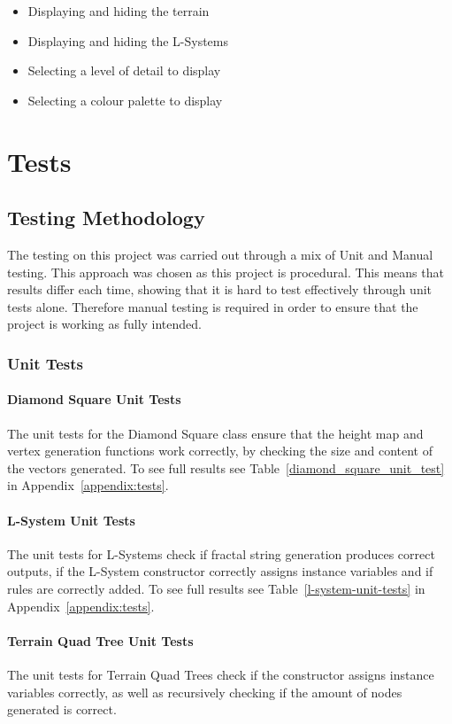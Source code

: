 \documentclass[a4paper,10pt]{report}
\begin{document}
\begin{itemize}
    \item Displaying and hiding the terrain
    \item Displaying and hiding the L-Systems
    \item Selecting a level of detail to display
    \item Selecting a colour palette to display
\end{itemize}

\chapter{Tests}
\section{Testing Methodology}
The testing on this project was carried out through a mix of Unit and Manual testing. This approach was chosen as this project is procedural. This means that results differ each time, showing that it is hard to test effectively through unit tests alone. Therefore manual testing is required in order to ensure that the project is working as fully intended.

\subsection{Unit Tests}
\subsubsection{Diamond Square Unit Tests}

The unit tests for the Diamond Square class ensure that the height map and vertex generation functions work correctly, by checking the size and content of the vectors generated. To see full results see Table~\ref{diamond_square_unit_test} in Appendix~\ref{appendix:tests}.

\subsubsection{L-System Unit Tests}
The unit tests for L-Systems check if fractal string generation produces correct outputs, if the L-System constructor correctly assigns instance variables and if rules are correctly added. To see full results see Table~\ref{l-system-unit-tests} in Appendix~\ref{appendix:tests}.

\subsubsection{Terrain Quad Tree Unit Tests}
The unit tests for Terrain Quad Trees check if the constructor assigns instance variables correctly, as well as recursively checking if the amount of nodes generated is correct.
\end{document}
